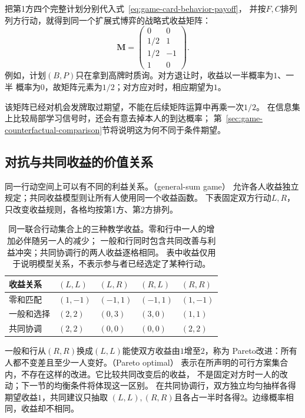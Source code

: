 把第1方四个完整计划分别代入式~\eqref{eq:game-card-behavior-payoff}，
并按\(F,C\)排列列方行动，就得到同一个扩展式博弈的战略式收益矩阵：
\begin{equation}
  \bm{M}
  =
  \begin{pmatrix}
    0 & 0\\
    1/2 & 1\\
    1/2 & -1\\
    1 & 0
  \end{pmatrix}.
  \label{eq:game-card-normal-form}
\end{equation}
例如，计划\((B,P)\)只在拿到高牌时质询。对方退让时，收益以一半概率为\(1\)、一半
概率为\(0\)，故矩阵元素为\(1/2\)；对方应对时，相应期望为\(1\)。

该矩阵已经对机会发牌取过期望，不能在后续矩阵运算中再乘一次\(1/2\)。
在信息集上比较局部学习信号时，还会有意去掉本人的到达概率；
第~\ref{sec:game-counterfactual-comparison}节将说明这为何不同于条件期望。

\subsection{对抗与共同收益的价值关系}
\label{sec:game-payoff-relations}

同一行动空间上可以有不同的利益关系。（general-sum game）
允许各人收益独立规定；共同收益模型则让所有人使用同一个收益函数。
下表固定双方行动\(L,R\)，只改变收益规则，各格均按第1方、第2方排列。
\begin{table}[htbp]
  \centering
  \begin{tabularx}{\linewidth}{lXXXX}
    \toprule
    收益关系 & $(L,L)$ & $(L,R)$ & $(R,L)$ & $(R,R)$\\
    \midrule
    零和匹配 & $(1,-1)$ & $(-1,1)$ & $(-1,1)$ & $(1,-1)$\\
    一般和选择 & $(2,2)$ & $(0,3)$ & $(3,0)$ & $(1,1)$\\
    共同协调 & $(2,2)$ & $(0,0)$ & $(0,0)$ & $(2,2)$\\
    \bottomrule
  \end{tabularx}
  \caption{同一联合行动集合上的三种教学收益。零和行中一人的增加必伴随另一人的减少；
  一般和行同时包含共同改善与利益冲突；共同协调行的两人收益逐格相同。
  表中收益仅用于说明模型关系，不表示参与者已经选定了某种行动。}
  \label{tab:game-payoff-structures}
\end{table}

一般和行从\((R,R)\)换成\((L,L)\)能使双方收益由\(1\)增至\(2\)，称为
Pareto改进：所有人都不变差且至少一人变好。（Pareto optimal）
表示在所声明的可行方案集合内，不存在这样的改进。它比较共同改变后的收益，
不是固定对方时一人的改动；下一节的均衡条件将体现这一区别。
在共同协调行，双方独立均匀抽样各得期望收益\(1\)，共同建议只抽取
\((L,L),(R,R)\)且各占一半时各得\(2\)。边缘概率相同，收益却不相同。

